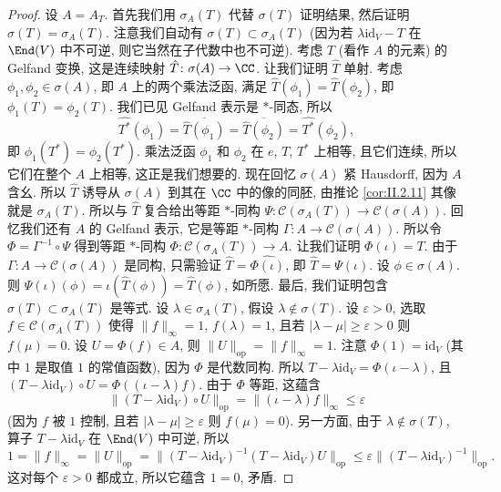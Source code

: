 \begin{proof}
设 $A = A_T$. 首先我们用 $\sigma_A(T)$ 代替 $\sigma(T)$ 证明结果, 然后证明 $\sigma(T) = \sigma_A(T)$. 注意我们自动有 $\sigma(T) \subset \sigma_A(T)$ (因为若 $\lambda\mathrm{id}_V - T$ 在 $\End(V)$ 中不可逆, 则它当然在子代数中也不可逆).
考虑 $T$ (看作 $A$ 的元素) 的 Gelfand 变换, 这是连续映射 $\hat{T} \colon \sigma(A) \to \CC$. 让我们证明 $\hat{T}$ 单射. 考虑 $\phi_1, \phi_2 \in \sigma(A)$, 即 $A$ 上的两个乘法泛函, 满足 $\hat{T}(\phi_1) = \hat{T}(\phi_2)$, 即 $\phi_1(T) = \phi_2(T)$. 我们已见 Gelfand 表示是 $*$-同态, 所以
\[
\widehat{T^*}(\phi_1) = \overline{\hat{T}(\phi_1)} = \overline{\hat{T}(\phi_2)} = \widehat{T^*}(\phi_2),
\]
即 $\phi_1(T^*) = \phi_2(T^*)$. 乘法泛函 $\phi_1$ 和 $\phi_2$ 在 $e$, $T$, $T^*$ 上相等, 且它们连续, 所以它们在整个 $A$ 上相等, 这正是我们想要的.
现在回忆 $\sigma(A)$ 紧 Hausdorff, 因为 $A$ 含幺. 所以 $\hat{T}$ 诱导从 $\sigma(A)$ 到其在 $\CC$ 中的像的同胚, 由推论 \ref{cor:II.2.11} 其像就是 $\sigma_A(T)$. 所以与 $\hat{T}$ 复合给出等距 $*$-同构 $\Psi \colon \mathcal{C}(\sigma_A(T)) \to \mathcal{C}(\sigma(A))$.
回忆我们还有 $A$ 的 Gelfand 表示, 它是等距 $*$-同构 $\Gamma \colon A \to \mathcal{C}(\sigma(A))$. 所以令 $\Phi = \Gamma^{-1} \circ \Psi$ 得到等距 $*$-同构 $\Phi \colon \mathcal{C}(\sigma_A(T)) \to A$.
让我们证明 $\Phi(\iota) = T$. 由于 $\Gamma \colon A \to \mathcal{C}(\sigma(A))$ 是同构, 只需验证 $\hat{T} = \widehat{\Phi(\iota)}$, 即 $\hat{T} = \Psi(\iota)$. 设 $\phi \in \sigma(A)$. 则 $\Psi(\iota)(\phi) = \iota(\hat{T}(\phi)) = \hat{T}(\phi)$, 如所愿.
最后, 我们证明包含 $\sigma(T) \subset \sigma_A(T)$ 是等式. 设 $\lambda \in \sigma_A(T)$, 假设 $\lambda \notin \sigma(T)$. 设 $\varepsilon > 0$, 选取 $f \in \mathcal{C}(\sigma_A(T))$ 使得 $\|f\|_{\infty} = 1$, $f(\lambda) = 1$, 且若 $|\lambda - \mu| \geq \varepsilon > 0$ 则 $f(\mu) = 0$. 设 $U = \Phi(f) \in A$, 则 $\|U\|_{\mathrm{op}} = \|f\|_{\infty} = 1$. 注意 $\Phi(1) = \mathrm{id}_V$ (其中 $1$ 是取值 $1$ 的常值函数), 因为 $\Phi$ 是代数同构. 所以 $T - \lambda\mathrm{id}_V = \Phi(\iota - \lambda)$, 且 $(T - \lambda\mathrm{id}_V) \circ U = \Phi((\iota - \lambda)f)$. 由于 $\Phi$ 等距, 这蕴含
\[
\|(T - \lambda\mathrm{id}_V) \circ U\|_{\mathrm{op}} = \|(\iota - \lambda)f\|_{\infty} \leq \varepsilon
\]
(因为 $f$ 被 $1$ 控制, 且若 $|\lambda - \mu| \geq \varepsilon$ 则 $f(\mu) = 0$). 另一方面, 由于 $\lambda \notin \sigma(T)$, 算子 $T - \lambda\mathrm{id}_V$ 在 $\End(V)$ 中可逆, 所以
\[
1 = \|f\|_{\infty} = \|U\|_{\mathrm{op}} = \|(T - \lambda\mathrm{id}_V)^{-1}(T - \lambda\mathrm{id}_V)U\|_{\mathrm{op}} \leq \varepsilon\|(T - \lambda\mathrm{id}_V)^{-1}\|_{\mathrm{op}}.
\]
这对每个 $\varepsilon > 0$ 都成立, 所以它蕴含 $1 = 0$, 矛盾.
\end{proof}


